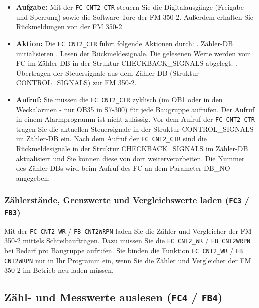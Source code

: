 \begin{itemize}
    \item \textbf{Aufgabe: } Mit der \texttt{FC CNT2\_CTR} steuern Sie die Digitalausgänge (Freigabe und Sperrung) sowie die Software-Tore der FM 350-2. Außerdem erhalten Sie Rückmeldungen von der FM 350-2.
    \item \textbf{Aktion: } Die \texttt{FC CNT2\_CTR} führt folgende Aktionen durch: 
                            . Zähler-DB initialisieren 
                            . Lesen der Rückmeldesignale. Die gelesenen Werte werden vom FC im Zähler-DB in der 
                            Struktur CHECKBACK\_SIGNALS abgelegt. 
                            . Übertragen der Steuersignale aus dem Zähler-DB (Struktur CONTROL\_SIGNALS) zur 
                            FM 350-2.
    \item \textbf{Aufruf: } Sie müssen die \texttt{FC CNT2\_CTR} zyklisch (im OB1 oder in den Weckalarmen - nur OB35 in 
    S7-300) für jede Baugruppe aufrufen. Der Aufruf in einem Alarmprogramm ist nicht zulässig. 
    Vor dem Aufruf der \texttt{FC CNT2\_CTR} tragen Sie die aktuellen Steuersignale in der Struktur 
    CONTROL\_SIGNALS im Zähler-DB ein. Nach dem Aufruf der \texttt{FC CNT2\_CTR} sind die 
    Rückmeldesignale in der Struktur CHECKBACK\_SIGNALS im Zähler-DB aktualisiert und Sie 
    können diese von dort weiterverarbeiten. 
    Die Nummer des Zähler-DBs wird beim Aufruf des FC an dem Parameter DB\_NO 
    angegeben.
\end{itemize}

\subsubsection{Zählerstände, Grenzwerte und Vergleichswerte laden (\texttt{FC3} / \texttt{FB3})}

Mit der \texttt{FC CNT2\_WR} / \texttt{FB CNT2WRPN} laden Sie die Zähler und Vergleicher der FM 350-2 
mittels Schreibaufträgen. Dazu müssen Sie die \texttt{FC CNT2\_WR} / \texttt{FB CNT2WRPN} bei Bedarf 
pro Baugruppe aufrufen.  
Sie binden die Funktion \texttt{FC CNT2\_WR} / \texttt{FB CNT2WRPN} nur in Ihr Programm ein, wenn Sie 
die Zähler und Vergleicher der FM 350-2 im Betrieb neu laden müssen.
 
\subsection{Zähl- und Messwerte auslesen (\texttt{FC4} / \texttt{FB4})}

